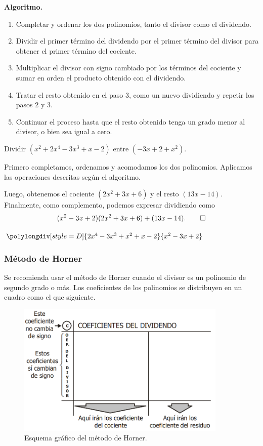 \textbf{Algoritmo.}
\begin{enumerate}
    \item Completar y ordenar los dos polinomios, tanto el divisor como el dividendo.
    \item Dividir el primer término del dividendo por el primer término del divisor para obtener el primer término del cociente.
    \item Multiplicar el divisor con signo cambiado por los términos del cociente y sumar en orden el producto obtenido con el dividendo.
    \item Tratar el resto obtenido en el paso 3, como un nuevo dividiendo y repetir los pasos 2 y 3.
    \item Continuar el proceso hasta que el resto obtenido tenga un grado menor al divisor, o bien sea igual a cero.
\end{enumerate}

\begin{example}
    Dividir $(x^2 + 2x^4 - 3x^3 + x - 2)$ entre $(- 3x + 2 + x^2)$.
\end{example}
\begin{multicols}{2}
    \begin{solution}
        Primero completamos, ordenamos y acomodamos los dos polinomios.
        Aplicamos las operaciones descritas según el algoritmo.

        Luego, obtenemos el cociente $(2x^2 + 3x + 6)$ y el resto $(13x - 14)$.
        Finalmente, como complemento, podemos expresar dividiendo como
        \[
            (x^2 - 3x + 2)(2x^2 + 3x + 6) + (13x - 14).\qedhere
        \]
    \end{solution}
    $\polylongdiv[style=D]{2x^4 - 3x^3 + x^2 +  x - 2}{x^2 - 3x + 2}$
\end{multicols}


\subsubsection{Método de Horner}

Se recomienda usar el método de Horner cuando el divisor es un polinomio de segundo grado o más.
Los coeficientes de los polinomios se distribuyen en un cuadro como el que siguiente.

\begin{figure}[H]
    \centering
    \includegraphics[width=10cm]{images/esquema-grafico-horner}
    \caption{Esquema gráfico del método de Horner.}
    \label{fig:figure}
\end{figure}

